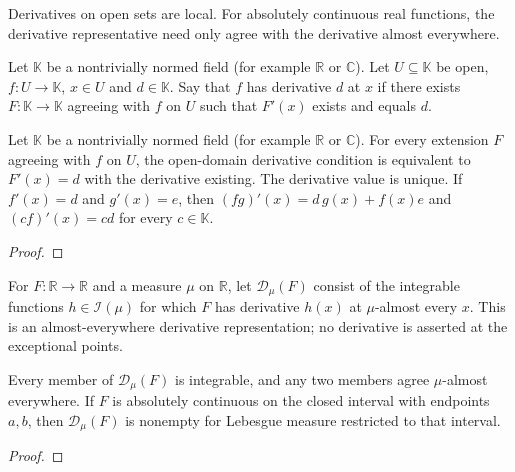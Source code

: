 Derivatives on open sets are local. For absolutely continuous real functions, the derivative representative need only agree with the derivative almost everywhere.

\begin{definition}
\label{def:open-domain-derivative}
\leanok
Let $\mathbb K$ be a nontrivially normed field (for example $\mathbb R$ or $\mathbb C$). Let $U\subseteq\mathbb K$ be open, $f:U\to\mathbb K$, $x\in U$ and $d\in\mathbb K$.
Say that $f$ has derivative $d$ at $x$ if there exists $F:\mathbb K\to\mathbb K$
agreeing with $f$ on $U$ such that $F'(x)$ exists and equals $d$.
\end{definition}

\begin{theorem}
\label{thm:open-domain-derivative}
\leanok
Let $\mathbb K$ be a nontrivially normed field (for example $\mathbb R$ or $\mathbb C$).
For every extension $F$ agreeing with $f$ on $U$, the open-domain derivative
condition is equivalent to $F'(x)=d$ with the derivative existing.
The derivative value is unique. If $f'(x)=d$ and $g'(x)=e$, then
$(fg)'(x)=d\,g(x)+f(x)e$ and $(cf)'(x)=cd$ for every $c\in\mathbb K$.
\end{theorem}
\begin{proof}
\leanok
\end{proof}

\begin{definition}
\label{def:integrable-derivative}
\leanok
For $F:\mathbb R\to\mathbb R$ and a measure $\mu$ on $\mathbb R$, let
$\mathcal D_\mu(F)$ consist of the integrable functions $h\in\mathcal I(\mu)$
for which $F$ has derivative $h(x)$ at $\mu$-almost every $x$.
This is an almost-everywhere derivative representation; no derivative is
asserted at the exceptional points.
\end{definition}

\begin{theorem}
\label{thm:integrable-derivative}
\leanok
Every member of $\mathcal D_\mu(F)$ is integrable, and any two members agree
$\mu$-almost everywhere. If $F$ is absolutely continuous on the closed interval
with endpoints $a,b$, then $\mathcal D_\mu(F)$ is nonempty for Lebesgue measure
restricted to that interval.
\end{theorem}
\begin{proof}
\leanok
\end{proof}

